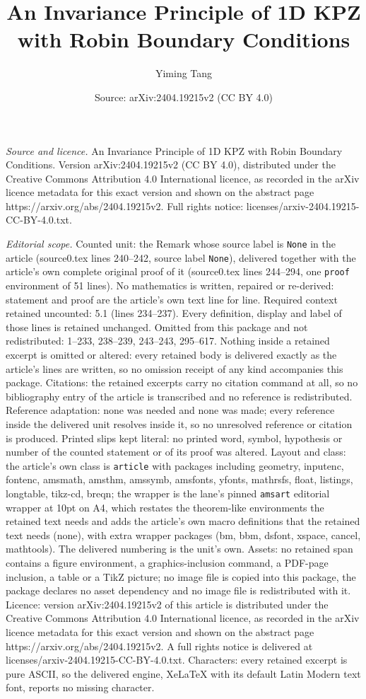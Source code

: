 \documentclass[10pt,a4paper]{amsart}
\title[An Invariance Principle of 1D KPZ with Robin Boundary Condit]{An Invariance Principle of 1D KPZ with Robin Boundary Conditions}
\author{Yiming Tang}
\date{Source: arXiv:2404.19215v2 (CC BY 4.0)}
\begin{document}
\maketitle

\noindent\emph{Source and licence.} An Invariance Principle of 1D KPZ with Robin Boundary Conditions. Version arXiv:2404.19215v2 (CC BY 4.0), distributed under the Creative Commons Attribution 4.0 International licence, as recorded in the arXiv licence metadata for this exact version and shown on the abstract page https://arxiv.org/abs/2404.19215v2. Full rights notice: licenses/arxiv-2404.19215-CC-BY-4.0.txt.\par\smallskip

\noindent\textit{Editorial scope.} Counted unit: the Remark whose source label is \texttt{None} in the article (source0.tex lines 240--242, source label \texttt{None}), delivered together with the article's own complete original proof of it (source0.tex lines 244--294, one \texttt{proof} environment of 51 lines). No mathematics is written, repaired or re-derived: statement and proof are the article's own text line for line. Required context retained uncounted: 5.1 (lines 234--237). Every definition, display and label of those lines is retained unchanged. Omitted from this package and not redistributed: 1--233, 238--239, 243--243, 295--617. Nothing inside a retained excerpt is omitted or altered: every retained body is delivered exactly as the article's lines are written, so no omission receipt of any kind accompanies this package. Citations: the retained excerpts carry no citation command at all, so no bibliography entry of the article is transcribed and no reference is redistributed. Reference adaptation: none was needed and none was made; every reference inside the delivered unit resolves inside it, so no unresolved reference or citation is produced. Printed slips kept literal: no printed word, symbol, hypothesis or number of the counted statement or of its proof was altered. Layout and class: the article's own class is \texttt{article} with packages including geometry, inputenc, fontenc, amsmath, amsthm, amssymb, amsfonts, yfonts, mathrsfs, float, listings, longtable, tikz-cd, breqn; the wrapper is the lane's pinned \texttt{amsart} editorial wrapper at 10pt on A4, which restates the theorem-like environments the retained text needs and adds the article's own macro definitions that the retained text needs (none), with extra wrapper packages (bm, bbm, dsfont, xspace, cancel, mathtools). The delivered numbering is the unit's own. Assets: no retained span contains a figure environment, a graphics-inclusion command, a PDF-page inclusion, a table or a TikZ picture; no image file is copied into this package, the package declares no asset dependency and no image file is redistributed with it. Licence: version arXiv:2404.19215v2 of this article is distributed under the Creative Commons Attribution 4.0 International licence, as recorded in the arXiv licence metadata for this exact version and shown on the abstract page https://arxiv.org/abs/2404.19215v2. A full rights notice is delivered at licenses/arxiv-2404.19215-CC-BY-4.0.txt. Characters: every retained excerpt is pure ASCII, so the delivered engine, XeLaTeX with its default Latin Modern text font, reports no missing character.
\end{document}
